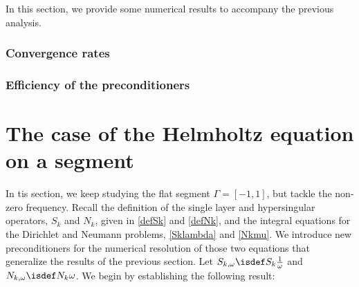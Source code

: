 \documentclass[a4paper]{article}
\begin{document}
	In this section, we provide some numerical results to accompany the previous analysis. 
	
	
	
	\paragraph{}
	
	
	\subsubsection{Convergence rates}
	\subsubsection{Efficiency of the preconditioners}
	
	
	\section{The case of the Helmholtz equation on a segment}
	
	In tis section, we keep studying the flat segment $\Gamma = [-1,1]$, but tackle the non-zero frequency. Recall the definition of the single layer and hypersingular operators, $S_k$ and $N_k$, given in \eqref{defSk} and \eqref{defNk}, and the integral equations for the Dirichlet and Neumann problems, \eqref{Sklambda} and \eqref{Nkmu}. We introduce new preconditioners for the numerical resolution of those two equations that generalize the results of the previous section.  Let $S_{k,\omega} \isdef S_k \frac{1}{\omega}$ and $N_{k,\omega} \isdef N_k \omega$. We begin by establishing the following result:
	
\end{document}
